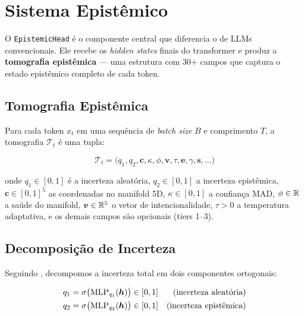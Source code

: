 
\section{Sistema Epist\^emico}
\label{sec:epistemico}

O \texttt{EpistemicHead} \'e o componente central que diferencia o \aletheion{}
de LLMs convencionais. Ele recebe os \textit{hidden states} finais do transformer
e produz a \textbf{tomografia epist\^emica} --- uma estrutura com 30+ campos
que captura o estado epist\^emico completo de cada token.

\subsection{Tomografia Epist\^emica}

\begin{definition}
\label{def:tomografia}
Para cada token $x_t$ em uma sequ\^encia de \textit{batch size} $B$ e
comprimento $T$, a tomografia $\mathcal{T}_t$ \'e uma tupla:

\begin{equation}
    \mathcal{T}_t = \big(q_1, q_2, \bm{c}, \kappa, \phi, \bm{v}, \tau, \bm{e}, \gamma, \bm{s}, \ldots\big)
\end{equation}

onde $q_1 \in [0,1]$ \'e a incerteza aleat\'oria, $q_2 \in [0,1]$ a incerteza
epist\^emica, $\bm{c} \in [0,1]^5$ as coordenadas no manifold 5D,
$\kappa \in [0,1]$ a confian\c{c}a MAD, $\phi \in \mathbb{R}$ a sa\'ude do manifold,
$\bm{v} \in \mathbb{R}^5$ o vetor de intencionalidade, $\tau > 0$ a temperatura
adaptativa, e os demais campos s\~ao opcionais (tiers 1--3).
\end{definition}

\subsection{Decomposi\c{c}\~ao de Incerteza}

Seguindo \cite{der2009aleatory}, decompomos a incerteza total em dois
componentes ortogonais:

\begin{align}
    q_1 &= \sigma\big(\text{MLP}_{q_1}(\bm{h})\big) \in [0, 1] & \text{(incerteza aleat\'oria)} \\
    q_2 &= \sigma\big(\text{MLP}_{q_2}(\bm{h})\big) \in [0, 1] & \text{(incerteza epist\^emica)}
\end{align}

